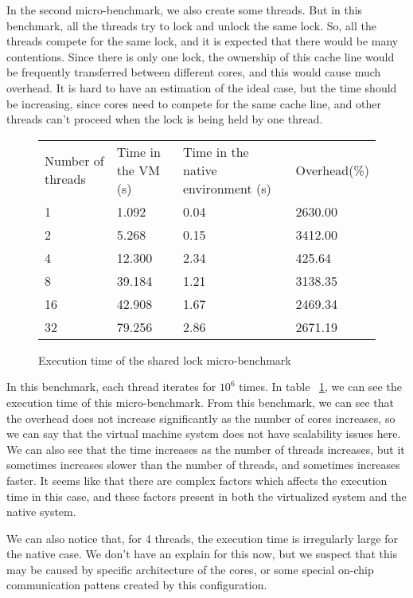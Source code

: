In the second micro-benchmark, we also create some threads. But in this
benchmark, all the threads try to lock and unlock the same lock. So, all the
threads compete for the same lock, and it is expected that there would be many
contentions.  Since there is only one lock, the ownership of this cache line
would be frequently transferred between different cores, and this would cause
much overhead. It is hard to have an estimation of the ideal case, but the time
should be increasing, since cores need to compete for the same cache line, and
other threads can't proceed when the lock is being held by one thread.

\begin{figure}[here]
\begin{tabular}{  l | l | l | l }
	Number of threads & Time in the VM (s) & Time in the native environment (s) & Overhead(\%) \\
	1 & 1.092 & 0.04 & 2630.00 \\
	2 & 5.268 & 0.15 & 3412.00 \\
	4 & 12.300 & 2.34 & 425.64 \\
	8 & 39.184 & 1.21 & 3138.35 \\
	16 & 42.908 & 1.67 & 2469.34 \\
	32 & 79.256 & 2.86 & 2671.19 \\
\end{tabular}
\caption{Execution time of the shared lock micro-benchmark}
\label{fig:com_mutex}
\end{figure}

In this benchmark, each thread iterates for $10^6$ times.
In table ~\ref{fig:com_mutex}, we can see the execution time of this micro-benchmark.
From this benchmark, we can see that the overhead does not increase significantly
as the number of cores increases, so we can say that the virtual machine system
does not have scalability issues here.
We can also see that the time increases as the number of threads increases, but
it sometimes increases slower than the number of threads, and sometimes increases
faster. It seems like that there are complex factors which affects the execution
time in this case, and these factors present in both the virtualized system and the
native system.

We can also notice that, for 4 threads, the execution time is irregularly large
for the native case. We don't have an explain for this now, but we suspect that
this may be caused by specific architecture of the cores, or some special
on-chip communication pattens created by this configuration.



